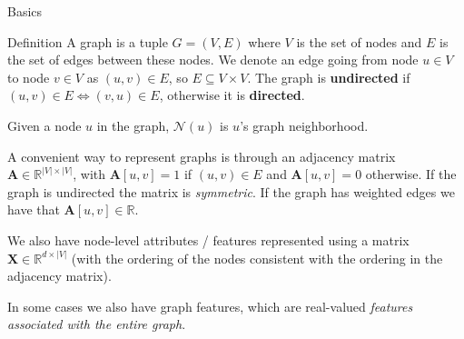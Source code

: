 \documentclass[10pt, aspectratio=169, compress, protectframetitle, handout]{beamer}
\begin{document}
\begin{frame}{Basics}
    
    \begin{block}{Definition}
        A \alert{graph} is a tuple $G = (V, E)$ where $V$ is the set of nodes and $E$ is the set of edges between these nodes. We denote an edge going from node $u \in V$ to node $v \in V$ as $(u, v) \in E$, so $E \subseteq V \times V$. The graph is \textbf{undirected} if $(u, v) \in E \Longleftrightarrow  (v, u) \in E$, otherwise it is \textbf{directed}.
    \end{block}
    
    Given a node $u$ in the graph, $\mathcal N(u)$ is $u$'s graph neighborhood.
    
    A convenient way to represent graphs is through an \alert{adjacency matrix} $\mathbf A \in \mathbb R^{|V| \times |V|}$, with $\mathbf A[u, v] = 1$ if $(u, v) \in E$ and $\mathbf A[u, v] = 0$ otherwise. If the graph is undirected the matrix is \emph{symmetric}. If the graph has weighted edges we have that $\mathbf A[u,v] \in \mathbb R$.
    
    We also have \alert{node-level attributes / features} represented using a matrix $\mathbf X \in \mathbb R^{d \times |V|}$ (with the ordering of the nodes consistent with the ordering in the adjacency matrix).
    
    In some cases we also have \alert{graph features}, which are real-valued \emph{features associated with the entire graph}.
    
\end{frame}
\end{document}
